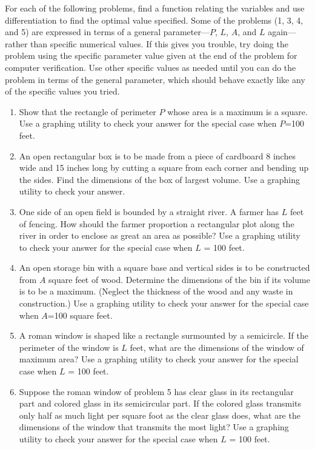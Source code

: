 For each of the following problems, find a function relating the
variables and use differentiation to find the optimal value specified.
Some of the problems (1, 3, 4, and 5) are expressed in terms of a
general parameter---$P$, $L$, $A$, and $L$ again---rather than
specific numerical values.  If this gives you trouble, try doing the
problem using the specific parameter value given at the end of the
problem for computer verification.  Use other specific values as
needed until you can do the problem in terms of the general parameter,
which should behave exactly like any of the specific values you tried.


\begin{enumerate}
\item Show that the rectangle of perimeter $P$ whose area is a maximum
is a square.  Use a graphing utility to check your answer for the
special case when $P$=100 feet.


\item An open rectangular box is to be made from a piece of cardboard 8
inches wide and 15 inches long by cutting a square from each corner
and bending up the sides.  Find the dimensions of the box of largest
volume.  Use a graphing utility to check your answer.


\item One side of an open field is bounded by a straight river.  A
farmer has $L$ feet of fencing.  How should the farmer proportion a
rectangular plot along the river in order to enclose as great an area
as possible?  Use a graphing utility to check your answer for the
special case when $L$ = 100 feet.


\item An open storage bin with a square base and vertical sides is to
be constructed from $A$ square feet of wood.  Determine the dimensions
of the bin if its volume is to be a maximum.  (Neglect the thickness
of the wood and any waste in construction.)  Use a graphing utility to
check your answer for the special case when $A$=100 square feet.


\item A roman window is shaped like a rectangle surmounted by a
semicircle.  If the perimeter of the window is $L$ feet, what are the
dimensions of the window of maximum area?  Use a graphing utility to
check your answer for the special case when $L$ = 100 feet.


\item Suppose the roman window of problem 5 has clear glass in its
rectangular part and colored glass in its semicircular part.  If the
colored glass transmits only half as much light per square foot as the
clear glass does, what are the dimensions of the window that transmits
the most light?  Use a graphing utility to check your answer for the
special case when $L$ = 100 feet.



\end{enumerate}
